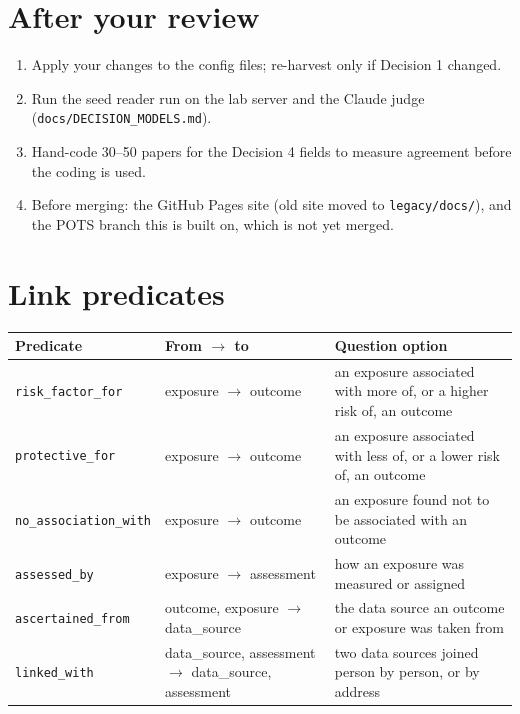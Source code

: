 \documentclass[10pt]{article}
\begin{document}
\section*{After your review}
\begin{enumerate}
\item Apply your changes to the config files; re-harvest only if Decision 1 changed.
\item Run the seed reader run on the lab server and the Claude judge (\texttt{docs/DECISION\_MODELS.md}).
\item Hand-code 30--50 papers for the Decision 4 fields to measure agreement before the coding is used.
\item Before merging: the GitHub Pages site (old site moved to \texttt{legacy/docs/}), and the POTS branch this is
built on, which is not yet merged.
\end{enumerate}

\appendix
\section{Link predicates}
\begin{center}\begin{tabular}{@{}lP{4.2cm}P{7.8cm}@{}}\toprule Predicate & From $\to$ to & Question option\\\midrule
\texttt{risk\_factor\_for} & exposure $\to$ outcome & an exposure associated with more of, or a higher risk of, an outcome\\
\texttt{protective\_for} & exposure $\to$ outcome & an exposure associated with less of, or a lower risk of, an outcome\\
\texttt{no\_association\_with} & exposure $\to$ outcome & an exposure found not to be associated with an outcome\\
\texttt{assessed\_by} & exposure $\to$ assessment & how an exposure was measured or assigned\\
\texttt{ascertained\_from} & outcome, exposure $\to$ data\_source & the data source an outcome or exposure was taken from\\
\texttt{linked\_with} & data\_source, assessment $\to$ data\_source, assessment & two data sources joined person by person, or by address\\
\bottomrule\end{tabular}\end{center}
\end{document}
